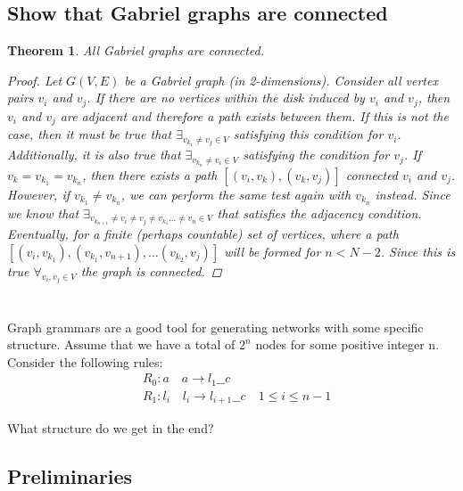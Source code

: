 \documentclass[]{article}
\numberwithin{equation}{section}
\newtheorem{theorem}{Theorem}
\begin{document}
\subsection{Show that Gabriel graphs are connected}
\begin{theorem}
    All Gabriel graphs are connected. 
    \begin{proof}
        Let $G(V,E)$ be a Gabriel graph (in 2-dimensions). 
        Consider all vertex pairs $v_i$ and $v_j$. 
        If there are no vertices within the disk induced by $v_i$ and $v_j$, then $v_i$ and $v_j$ are adjacent and therefore a path exists between them. 
        If this is not the case, then it must be true that $\exists_{v_{k_1} \neq v_j \in V}$ satisfying this condition for $v_i$. Additionally, it is also true that $\exists_{v_{k_n} \neq v_i \in V}$ satisfying the condition for $v_j$. 
        If $v_k = v_{k_1} = v_{k_n}$, then there exists a path $[(v_i, v_k), (v_k, v_j)]$ connected $v_i$ and $v_j$.
        However, if $v_{k_1} \neq v_{k_n}$, we can perform the same test again with $v_{k_n}$ instead. 
        Since we know that $\exists_{v_{k_{n+1}} \neq v_i \neq v_j \neq v_{k_{1}} \dots \neq v_{n} \in V}$ that satisfies the adjacency condition.
        Eventually, for a finite (perhaps countable) set of vertices, where a path $[(v_i, v_{k_1}), (v_{k_1}, v_{n+1}), \dots (v_{k_{2}}, v_{j})]$ will be formed for $n < N-2$.
        Since this is true $\forall_{v_i, v_j \in V}$ the graph is connected.
    \end{proof}
\end{theorem}

\newpage
\section{}
Graph grammars are a good tool for generating networks with some specific structure.
Assume that we have a total of $2^n$ nodes for some positive integer n. 
Consider the following rules:\begin{align*}
    &R_0 : a \quad a \rightarrow l_1 \_\_ c\\
    &R_1 : l_i \quad l_i \rightarrow l_{i+1} \_\_ c \quad 1\leq i \leq n-1
\end{align*}

What structure do we get in the end?

\subsection*{Preliminaries}
\end{document}
